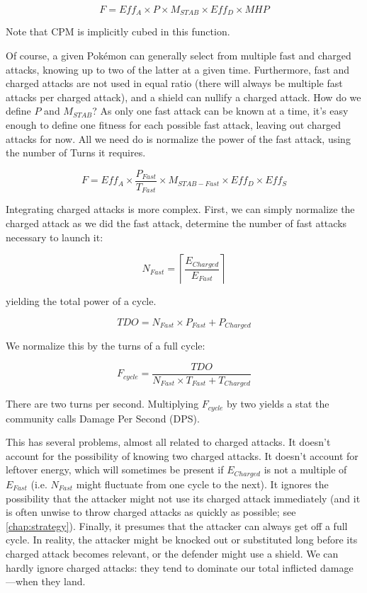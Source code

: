 \[ F = Eff_A \times P \times M_{STAB} \times Eff_D \times MHP \]

Note that CPM is implicitly cubed in this function.

Of course, a given Pokémon can generally select from multiple fast and charged attacks,
  knowing up to two of the latter at a given time.
Furthermore, fast and charged attacks are not used in equal ratio (there will
  always be multiple fast attacks per charged attack), and a shield can
  nullify a charged attack.
How do we define $P$ and $M_{STAB}$?
As only one fast attack can be known at a time, it's easy enough to define one
  fitness for each possible fast attack, leaving out charged attacks for now.
All we need do is normalize the power of the fast attack, using the number of
  Turns it requires.

\[ F = Eff_A \times \frac{P_{Fast}}{T_{Fast}} \times M_{STAB-Fast} \times Eff_D \times Eff_S \]

Integrating charged attacks is more complex.
First, we can simply normalize the charged attack as we did the fast attack,
 determine the number of fast attacks necessary to launch it:

\[ N_{Fast} = \left\lceil\frac{E_{Charged}}{E_{Fast}}\right\rceil \]

yielding the total power of a cycle.

\[ TDO = N_{Fast} \times P_{Fast} + P_{Charged} \]

We normalize this by the turns of a full cycle:

\[ F_{cycle} = \frac{TDO}{N_{Fast} \times T_{Fast} + T_{Charged}} \]

There are two turns per second.
Multiplying $F_{cycle}$ by two yields a stat the community calls Damage Per Second (DPS).

This has several problems, almost all related to charged attacks.
It doesn't account for the possibility of knowing two charged attacks.
It doesn't account for leftover energy, which will sometimes be present if
  $E_{Charged}$ is not a multiple of $E_{Fast}$ (i.e. $N_{Fast}$
  might fluctuate from one cycle to the next).
It ignores the possibility that the attacker might not use its charged attack
  immediately (and it is often unwise to throw charged attacks as quickly as
  possible; see \autoref{chap:strategy}).
Finally, it presumes that the attacker can always get off a full cycle.
In reality, the attacker might be knocked out or substituted long before its
  charged attack becomes relevant, or the defender might use a shield.
We can hardly ignore charged attacks: they tend to dominate our total inflicted damage---when they land.

